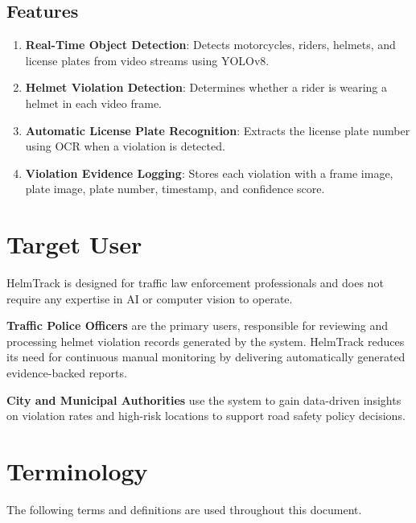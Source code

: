 \subsection{Features}
\label{subsection:features}

\begin{enumerate}[leftmargin=80pt]
    \item \textbf{Real-Time Object Detection}: Detects motorcycles, riders, helmets, and license plates from video streams using YOLOv8.
    \item \textbf{Helmet Violation Detection}: Determines whether a rider is wearing a helmet in each video frame.
    \item \textbf{Automatic License Plate Recognition}: Extracts the license plate number using OCR when a violation is detected.
    \item \textbf{Violation Evidence Logging}: Stores each violation with a frame image, plate image, plate number, timestamp, and confidence score.
\end{enumerate}

\section{Target User}
\label{section:target-user}

HelmTrack is designed for traffic law enforcement professionals and does not require any expertise in AI or computer vision to operate.

\textbf{Traffic Police Officers} are the primary users, responsible for reviewing and processing helmet violation records generated by the system. HelmTrack reduces its need for continuous manual monitoring by delivering automatically generated evidence-backed reports.

\textbf{City and Municipal Authorities} use the system to gain data-driven insights on violation rates and high-risk locations to support road safety policy decisions.

\section{Terminology}
\label{section:terminology}

The following terms and definitions are used throughout this document.

